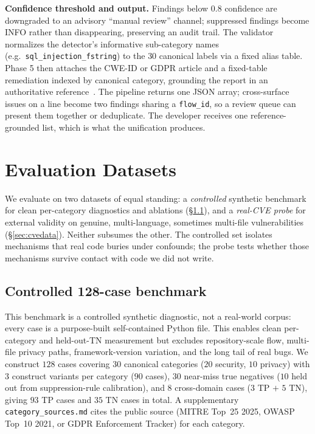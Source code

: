 \documentclass[runningheads]{llncs}
\begin{document}
\textbf{Confidence threshold and output.} Findings below $0.8$ confidence are downgraded to an advisory ``manual review'' channel; suppressed findings become INFO rather than disappearing, preserving an audit trail. The validator normalizes the detector's informative sub-category names (e.g.\ \texttt{sql\_injection\_fstring}) to the $30$ canonical labels via a fixed alias table. Phase 5 then attaches the CWE-ID or GDPR article and a fixed-table remediation indexed by canonical category, grounding the report in an authoritative reference~\cite{charoenwet2026agenticscr}. The pipeline returns one JSON array; cross-surface issues on a line become two findings sharing a \texttt{flow\_id}, so a review queue can present them together or deduplicate. The developer receives one reference-grounded list, which is what the unification produces.

\section{Evaluation Datasets}\label{sec:benchmark}

We evaluate on two datasets of equal standing: a \emph{controlled} synthetic benchmark for clean per-category diagnostics and ablations (\S\ref{sec:ctrlbench}), and a \emph{real-CVE probe} for external validity on genuine, multi-language, sometimes multi-file vulnerabilities (\S\ref{sec:cvedata}). Neither subsumes the other. The controlled set isolates mechanisms that real code buries under confounds; the probe tests whether those mechanisms survive contact with code we did not write.

\subsection{Controlled 128-case benchmark}\label{sec:ctrlbench}

This benchmark is a controlled synthetic diagnostic, not a real-world corpus: every case is a purpose-built self-contained Python file. This enables clean per-category and held-out-TN measurement but excludes repository-scale flow, multi-file privacy paths, framework-version variation, and the long tail of real bugs. We construct $128$ cases covering $30$ canonical categories ($20$ security, $10$ privacy) with $3$ construct variants per category ($90$ cases), $30$ near-miss true negatives ($10$ held out from suppression-rule calibration), and $8$ cross-domain cases ($3$ TP $+$ $5$ TN), giving $93$ TP cases and $35$ TN cases in total. A supplementary \texttt{category\_sources.md} cites the public source (MITRE Top~25 2025, OWASP Top~10 2021, or GDPR Enforcement Tracker) for each category.
\end{document}

